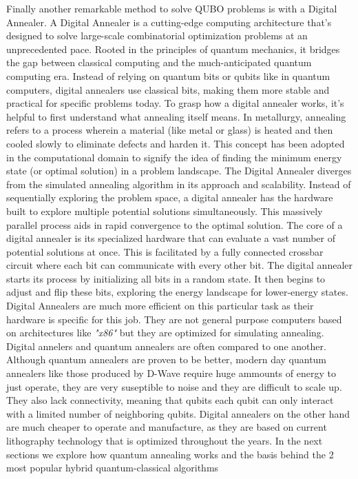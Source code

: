 \documentclass[12pt,a4paper]{report}
\begin{document}
\noindent
Finally another remarkable method to solve QUBO problems is with a Digital Annealer. A Digital Annealer is a cutting-edge computing architecture that's designed to solve large-scale combinatorial optimization problems at an unprecedented pace. Rooted in the principles of quantum mechanics, it bridges the gap between classical computing and the much-anticipated quantum computing era. Instead of relying on quantum bits or qubits like in quantum computers, digital annealers use classical bits, making them more stable and practical for specific problems today. To grasp how a digital annealer works, it's helpful to first understand what annealing itself means. In metallurgy, annealing refers to a process wherein a material (like metal or glass) is heated and then cooled slowly to eliminate defects and harden it. This concept has been adopted in the computational domain to signify the idea of finding the minimum energy state (or optimal solution) in a problem landscape. The Digital Annealer diverges from the simulated annealing algorithm in its approach and scalability. Instead of sequentially exploring the problem space, a digital annealer has the hardware built to explore multiple potential solutions simultaneously. This massively parallel process aids in rapid convergence to the optimal solution. The core of a digital annealer is its specialized hardware that can evaluate a vast number of potential solutions at once. This is facilitated by a fully connected crossbar circuit where each bit can communicate with every other bit. The digital annealer starts its process by initializing all bits in a random state. It then begins to adjust and flip these bits, exploring the energy landscape for lower-energy states. Digital Annealers are much more efficient on this particular task as their hardware is specific for this job. They are not general purpose computers based on architectures like \textit{"x86"} but they are optimized for simulating annealing.
\\

\noindent
Digital annelers and quantum annealers are often compared to one another. Although quantum annealers are proven to be better, modern day quantum annealers like those produced by D-Wave require huge ammounts of energy to just operate, they are very suseptible to noise and they are difficult to scale up. They also lack connectivity, meaning that qubits each qubit can only interact with a limited number of neighboring qubits. Digital annealers on the other hand are much cheaper to operate and manufacture, as they are based on current lithography technology that is optimized throughout the years. In the next sections we explore how quantum annealing works and the basis behind the 2 most popular hybrid quantum-classical algorithms
\newpage
\end{document}

